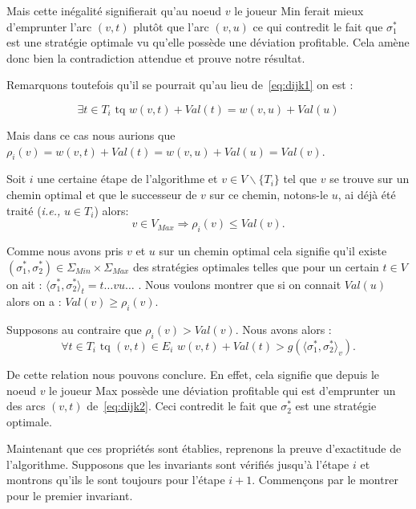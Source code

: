 \begin{demonstration}
Mais cette inégalité signifierait qu'au noeud $v$ le joueur Min ferait mieux d'emprunter l'arc $(v,t)$ plutôt que l'arc $(v,u)$ ce qui contredit le fait que $\sigma_1^*$ est une stratégie optimale vu qu'elle possède une déviation profitable. Cela amène donc bien la contradiction attendue et prouve notre résultat.

Remarquons toutefois qu'il se pourrait qu'au lieu de~\eqref{eq:dijk1} on est : 

$$ \exists t \in T_i \text{ tq } w(v,t) + Val(t) = w(v,u) + Val(u) $$

Mais dans ce cas nous aurions que $\rho_i(v)= w(v,t) + Val(t) = w(v,u) + Val(u) = Val(v)$. 

\end{demonstration}

\begin{propriete}
	\label{prop:dijk2}
	Soit $i$ une certaine étape de l'algorithme et $v \in V\backslash \{ T_i \}$ tel que $v$ se trouve sur un chemin optimal et que le successeur de $v$ sur ce chemin, notons-le $u$, ai déjà été traité (\emph{i.e.,} $u \in T_i$) alors:
	$$ v \in V_{Max} \Rightarrow \rho_i(v) \leq Val(v).$$
\end{propriete}

\begin{demonstration} 
	$\text{}$\\
	Comme nous avons pris $v$ et $u$ sur un chemin optimal cela signifie qu'il existe $(\sigma_1^*, \sigma_2^*) \in \Sigma_{Min} \times \Sigma_{Max}$ des stratégies optimales telles que pour un certain $t \in V$ on ait : $\langle \sigma_1^*, \sigma_2^* \rangle_t = t\ldots vu\ldots$ .
Nous voulons montrer que si on connait $Val(u)$ alors on a : $Val(v) \geq \rho_i(v)$.

Supposons au contraire que $ \rho_i(v) > Val(v)$. Nous avons alors : 
\begin{equation} \forall t \in T_i \text{ tq } (v,t)\in E_i \,\, w(v,t) + Val(t) > g(\langle \sigma_1^*, \sigma_2^*\rangle_v). \label{eq:dijk2}\end{equation}

De cette relation nous pouvons conclure. En effet, cela signifie que depuis le noeud $v$ le joueur Max possède une déviation profitable qui est d'emprunter un des arcs $(v,t)$ de~\eqref{eq:dijk2}. Ceci contredit le fait que $\sigma_2^*$ est une stratégie optimale.
	
\end{demonstration}

Maintenant que ces propriétés sont établies, reprenons la preuve d'exactitude de l'algorithme. Supposons que les invariants sont vérifiés jusqu'à l'étape $i$ et montrons qu'ils le sont toujours pour l'étape $i+1$.
Commençons par le montrer pour le premier invariant.

